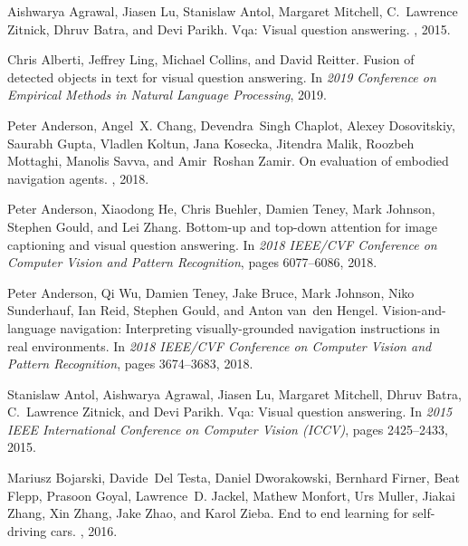 \documentclass[10pt,twocolumn,letterpaper]{article}
\begin{document}
\begin{thebibliography}{10}\itemsep=-1pt
	
	Aishwarya {Agrawal}, Jiasen {Lu}, Stanislaw {Antol}, Margaret {Mitchell},
	C.~Lawrence {Zitnick}, Dhruv {Batra}, and Devi {Parikh}.
	\newblock Vqa: Visual question answering.
	, 2015.
	
	Chris {Alberti}, Jeffrey {Ling}, Michael {Collins}, and David {Reitter}.
	\newblock Fusion of detected objects in text for visual question answering.
	\newblock In {\em 2019 Conference on Empirical Methods in Natural Language
		Processing}, 2019.
	
	Peter {Anderson}, Angel~X. {Chang}, Devendra~Singh {Chaplot}, Alexey
	{Dosovitskiy}, Saurabh {Gupta}, Vladlen {Koltun}, Jana {Kosecka}, Jitendra
	{Malik}, Roozbeh {Mottaghi}, Manolis {Savva}, and Amir~Roshan {Zamir}.
	\newblock On evaluation of embodied navigation agents.
	, 2018.
	
	Peter {Anderson}, Xiaodong {He}, Chris {Buehler}, Damien {Teney}, Mark
	{Johnson}, Stephen {Gould}, and Lei {Zhang}.
	\newblock Bottom-up and top-down attention for image captioning and visual
	question answering.
	\newblock In {\em 2018 IEEE/CVF Conference on Computer Vision and Pattern
		Recognition}, pages 6077--6086, 2018.
	
	Peter {Anderson}, Qi {Wu}, Damien {Teney}, Jake {Bruce}, Mark {Johnson}, Niko
	{Sunderhauf}, Ian {Reid}, Stephen {Gould}, and Anton van~den {Hengel}.
	\newblock Vision-and-language navigation: Interpreting visually-grounded
	navigation instructions in real environments.
	\newblock In {\em 2018 IEEE/CVF Conference on Computer Vision and Pattern
		Recognition}, pages 3674--3683, 2018.
	
	Stanislaw {Antol}, Aishwarya {Agrawal}, Jiasen {Lu}, Margaret {Mitchell}, Dhruv
	{Batra}, C.~Lawrence {Zitnick}, and Devi {Parikh}.
	\newblock Vqa: Visual question answering.
	\newblock In {\em 2015 IEEE International Conference on Computer Vision
		(ICCV)}, pages 2425--2433, 2015.
	
	Mariusz {Bojarski}, Davide~Del {Testa}, Daniel {Dworakowski}, Bernhard
	{Firner}, Beat {Flepp}, Prasoon {Goyal}, Lawrence~D. {Jackel}, Mathew
	{Monfort}, Urs {Muller}, Jiakai {Zhang}, Xin {Zhang}, Jake {Zhao}, and Karol
	{Zieba}.
	\newblock End to end learning for self-driving cars.
	, 2016.
	

\end{thebibliography}
\end{document}
